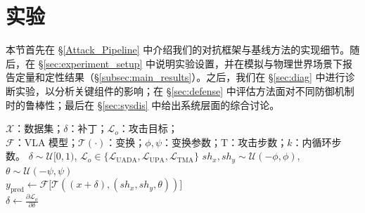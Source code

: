 \section{实验}

\label{sec:exp}
本节首先在 \S\ref{Attack_Pipeline} 中介绍我们的对抗框架与基线方法的实现细节。随后，在 \S\ref{sec:experiment_setup} 中说明实验设置，并在模拟与物理世界场景下报告定量和定性结果（\S\ref{subsec:main_results}）。之后，我们在 \S\ref{sec:diag} 中进行诊断实验，以分析关键组件的影响；在 \S\ref{sec:defense} 中评估方法面对不同防御机制时的鲁棒性；最后在 \S\ref{sec:sysdis} 中给出系统层面的综合讨论。

\begin{algorithm}
\caption{对抗补丁攻击。}
\begin{algorithmic}[1]
 $\mathcal{X}$：数据集；$\delta$：补丁；$\mathcal{L}_o$：攻击目标； \\ $\mathcal{F}$：VLA 模型；$\mathcal{T}(\cdot)$：变换；$\phi,\psi$：变换参数；T：攻击步数；$k$：内循环步数。
 $\delta \sim \mathcal{U}[0,1)$, $\mathcal{L}_o \in \{\mathcal{L}_{\text{UADA}}, \mathcal{L}_{\text{UPA}}, \mathcal{L}_{\text{TMA}}\} $
         \label{alg:innerloop}
            \STATE $sh_x,sh_y \sim \mathcal{U}(-\phi,\phi)$, $\theta \sim \mathcal{U}(-\psi,\psi)$  \\
            \STATE $y_{\text{pred}} \leftarrow \mathcal{F}\big[\mathcal{T}((x+\delta),(sh_x,sh_y,\theta))\big]$ \\ \label{alg:eot}
            \STATE $\delta \leftarrow \frac{\partial \mathcal{L}_o}{\partial \delta}$\\
            \ENDFOR
\ENDFOR
\end{algorithmic}
\label{algorithm:1}
\end{algorithm}
